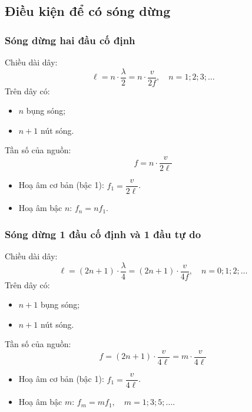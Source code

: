 \subsection{Điều kiện để có sóng dừng}
\subsubsection{Sóng dừng hai đầu cố định}
Chiều dài dây:
$$\ell=n\cdot\dfrac{\lambda}{2}=n\cdot\dfrac{v}{2f}, \quad n=1; 2; 3;\dots$$
Trên dây có:
\begin{itemize}
	\item $n$ bụng sóng;
	\item $n+1$ nút sóng.
\end{itemize}
Tần số của nguồn:
$$f=n\cdot\dfrac{v}{2\ell}$$
\begin{itemize}
	\item Hoạ âm cơ bản (bậc 1): $f_1=\dfrac{v}{2\ell}$.
	\item Hoạ âm bậc $n$: $f_n=nf_1$.
\end{itemize}
\subsubsection{Sóng dừng 1 đầu cố định và 1 đầu tự do}
Chiều dài dây:
$$\ell=\left(2n+1\right)\cdot\dfrac{\lambda}{4}=\left(2n+1\right)\cdot\dfrac{v}{4f}, \quad n=0; 1; 2;\dots$$
Trên dây có:
\begin{itemize}
	\item $n+1$ bụng sóng;
	\item $n+1$ nút sóng.
\end{itemize}
Tần số của nguồn:
$$f=\left(2n+1\right)\cdot\dfrac{v}{4\ell}=m\cdot\dfrac{v}{4\ell}$$
\begin{itemize}
	\item Hoạ âm cơ bản (bậc 1): $f_1=\dfrac{v}{4\ell}$.
	\item Hoạ âm bậc $m$: $f_m=mf_1, \quad m=1; 3; 5; \dots$.
\end{itemize}
